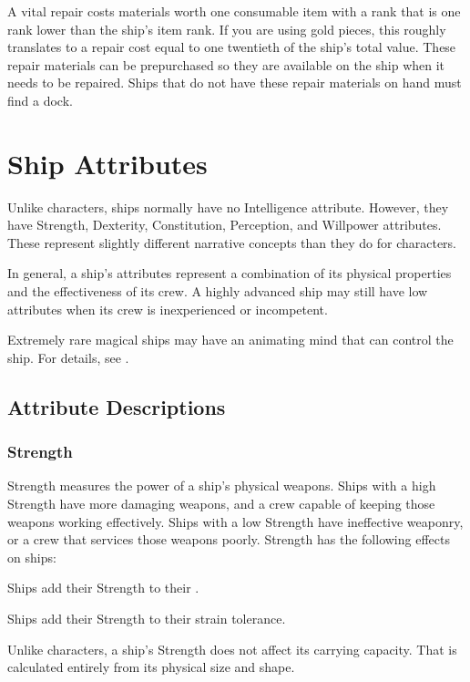     A vital repair costs materials worth one consumable item with a rank that is one rank lower than the ship's item rank.
    If you are using gold pieces, this roughly translates to a repair cost equal to one twentieth of the ship's total value.
    These repair materials can be prepurchased so they are available on the ship when it needs to be repaired.
    Ships that do not have these repair materials on hand must find a dock.

\section{Ship Attributes}\label{Ship Attributes}
  Unlike characters, ships normally have no Intelligence attribute.
  However, they have Strength, Dexterity, Constitution, Perception, and Willpower attributes.
  These represent slightly different narrative concepts than they do for characters.

  In general, a ship's attributes represent a combination of its physical properties and the effectiveness of its crew.
  A highly advanced ship may still have low attributes when its crew is inexperienced or incompetent.

  Extremely rare magical ships may have an animating mind that can control the ship.
  For details, see .

  \subsection{Attribute Descriptions}

    \subsubsection{Strength}
      Strength measures the power of a ship's physical weapons.
      Ships with a high Strength have more damaging weapons, and a crew capable of keeping those weapons working effectively.
      Ships with a low Strength have ineffective weaponry, or a crew that services those weapons poorly.
      Strength has the following effects on ships:
      \begin{raggeditemize}
        \item Ships add their Strength to their .
        \item Ships add their Strength to their strain tolerance.
      \end{raggeditemize}

      Unlike characters, a ship's Strength does not affect its carrying capacity.
      That is calculated entirely from its physical size and shape.

